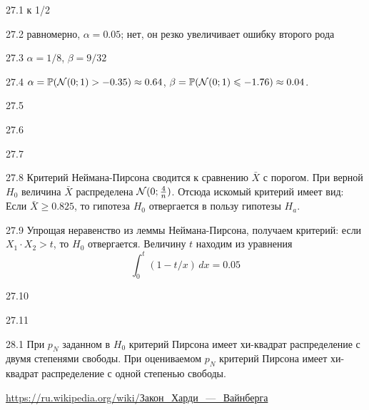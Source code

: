 \begin{solution}{{27.1}}
к 1/2
\end{solution}
\protect \hypertarget {soln:27.2}{}
\begin{solution}{{27.2}}
  равномерно, $\alpha=0.05$; нет, он резко увеличивает ошибку второго рода
\end{solution}
\protect \hypertarget {soln:27.3}{}
\begin{solution}{{27.3}}
  $\alpha = 1/8$, $\beta = 9/32$
\end{solution}
\protect \hypertarget {soln:27.4}{}
\begin{solution}{{27.4}}
  $\alpha = \mathbb{P}(\mathcal{N}(0;1) > -0.35) \approx 0.64$, $\beta = \mathbb{P}(\mathcal{N}(0;1) \leqslant -1.76) \approx 0.04$.
\end{solution}
\protect \hypertarget {soln:27.5}{}
\begin{solution}{{27.5}}
\end{solution}
\protect \hypertarget {soln:27.6}{}
\begin{solution}{{27.6}}
\end{solution}
\protect \hypertarget {soln:27.7}{}
\begin{solution}{{27.7}}

\end{solution}
\protect \hypertarget {soln:27.8}{}
\begin{solution}{{27.8}}
Критерий Неймана-Пирсона сводится к сравнению $\bar X$ с порогом. При верной $H_0$ величина $\bar X$ распределена $\mathcal{N}(0; \frac{4}{n})$.
Отсюда искомый критерий имеет вид:
Если $\bar X  \geqslant 0.825$, то гипотеза ${H_0}$ отвергается в пользу гипотезы ${H_a}$.
\end{solution}
\protect \hypertarget {soln:27.9}{}
\begin{solution}{{27.9}}
  Упрощая неравенство из леммы Неймана-Пирсона, получаем критерий: если $X_1\cdot X_2 >t$, то $H_0$ отвергается. Величину $t$ находим из уравнения
\[
\int_0^t (1 - t/x) \, dx = 0.05
\]
\end{solution}
\protect \hypertarget {soln:27.10}{}
\begin{solution}{{27.10}}

\end{solution}
\protect \hypertarget {soln:27.11}{}
\begin{solution}{{27.11}}
\end{solution}
\protect \hypertarget {soln:28.1}{}
\begin{solution}{{28.1}}
При $p_N$ заданном в $H_0$ критерий Пирсона имеет хи-квадрат распределение с двумя степенями свободы.
При оцениваемом $p_N$ критерий Пирсона имеет хи-квадрат распределение с одной степенью свободы.

\url{https://ru.wikipedia.org/wiki/Закон_Харди_—_Вайнберга}
  
\end{solution}
